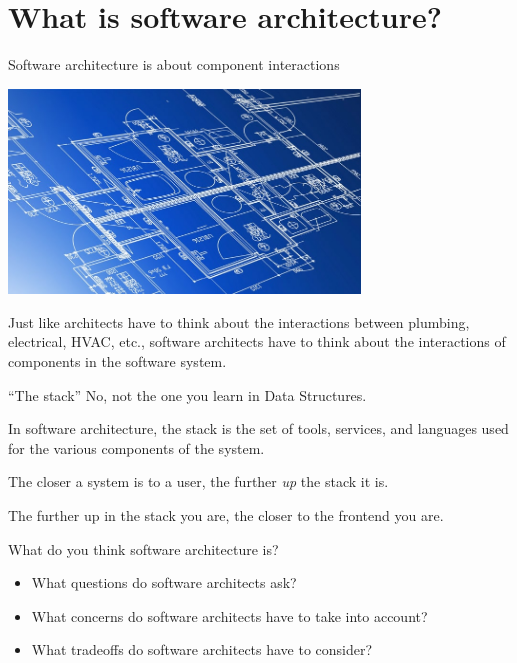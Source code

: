 \documentclass{beeper}
\begin{document}
\section{What is software architecture?}

\begin{frame}{Software architecture is about component interactions}
    \centerline{\includegraphics[width=0.7\textwidth]{images/architectural-blueprint}}

    Just like architects have to think about the interactions between plumbing,
    electrical, HVAC, etc., software architects have to think about the
    interactions of components in the software system.
\end{frame}

\begin{frame}{``The stack''}
    No, not the one you learn in Data Structures.
    \pause

    In software architecture, the stack is the set of tools, services, and
    languages used for the various components of the system.
    \pause

    The closer a system is to a user, the further \textit{up} the stack it is.

    The further up in the stack you are, the closer to the frontend you are.
\end{frame}

\begin{frame}{What do you think software architecture is?}
    \begin{itemize}[<+->]
        \item What questions do software architects ask?
        \item What concerns do software architects have to take into account?
        \item What tradeoffs do software architects have to consider?
    \end{itemize}
\end{frame}
\end{document}
